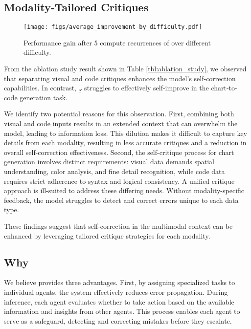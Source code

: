 \subsection{Modality-Tailored Critiques} \label{sec:result_multimodal_self_critique}

\begin{figure} [tbp]
    \centering
    \texttt{[image: figs/average\_improvement\_by\_difficulty.pdf]}
    \caption{Performance gain after 5 compute recurrences of \model{} over different  difficulty.}
    \vspace{-0.2in}
    \label{fig:improv_by_diff}
\end{figure}

From the ablation study result shown in Table \ref{tbl:ablation_study}, we observed that separating visual and code critiques enhances the model's self-correction capabilities. In contrast, \model{}$_S$ struggles to effectively self-improve in the chart-to-code generation task.

We identify two potential reasons for this observation. First, combining both visual and code inputs results in an extended context that can overwhelm the model, leading to information loss. This dilution makes it difficult to capture key details from each modality, resulting in less accurate critiques and a reduction in overall self-correction effectiveness. Second, the self-critique process for chart generation involves distinct requirements: visual data demands spatial understanding, color analysis, and fine detail recognition, while code data requires strict adherence to syntax and logical consistency. A unified critique approach is ill-suited to address these differing needs. Without modality-specific feedback, the model struggles to detect and correct errors unique to each data type.

These findings suggest that self-correction in the multimodal context can be enhanced by leveraging tailored critique strategies for each modality.

\subsection{Why \model{}} 
\label{sec:why_metal}

We believe \model{} provides three advantages. 
First, by assigning specialized tasks to individual agents, the system effectively reduces error propagation. During inference, each agent evaluates whether to take action based on the available information and insights from other agents. This process enables each agent to serve as a safeguard, detecting and correcting mistakes before they escalate. 

